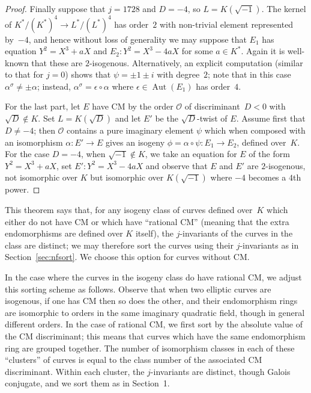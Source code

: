 \documentclass{article}
\theoremstyle{remark}
\def\OO{{\mathcal O}}
\DeclareMathOperator{\Aut}{Aut}
\begin{document}
\begin{proof}
Finally suppose that $j=1728$ and $D=-4$, so $L=K(\sqrt{-1})$.  The
kernel of $K^*/(K^*)^4 \to L^*/(L^*)^4$ has order~$2$ with non-trivial
element represented by~$-4$, and hence without loss of generality we
may suppose that $E_1$ has equation $Y^2=X^3+aX$ and $E_2:
Y^2=X^3-4aX$ for some $a\in K^*$.  Again it is well-known that these
are $2$-isogenous.  Alternatively, an explicit computation (similar to
that for $j=0$) shows that $\psi=\pm1\pm i$ with degree~$2$; note that
in this case $\alpha^{\sigma}\not=\pm\alpha$; instead,
$\alpha^{\sigma}=\epsilon\circ\alpha$ where $\epsilon\in\Aut(E_1)$ has
order~$4$.

For the last part, let $E$ have CM by the order $\OO$ of
discriminant~$D<0$ with $\sqrt{D}\notin K$.  Set $L=K(\sqrt{D})$ and
let $E'$ be the $\sqrt{D}$-twist of $E$.  Assume first that
$D\not=-4$; then $\OO$ contains a pure imaginary element $\psi$ which
when composed with an isomorphism $\alpha:E'\to E$ gives an isogeny
$\phi=\alpha\circ\psi:E_1\to E_2$, defined over~$K$.  For the case
$D=-4$, when $\sqrt{-1}\notin K$, we take an equation for $E$ of the
form $Y^2=X^3+aX$, set $E': Y^2=X^3-4aX$ and observe that $E$ and $E'$
are $2$-isogenous, not isomorphic over $K$ but isomorphic over
$K(\sqrt{-1})$ where $-4$ becomes a $4$th power.

\end{proof}

This theorem says that, for any isogeny class of curves defined
over~$K$ which either do not have CM or which have ``rational CM''
(meaning that the extra endomorphisms are defined over $K$ itself),
the $j$-invariants of the curves in the class are distinct; we may
therefore sort the curves using their $j$-invariants as in
Section~\ref{sec:nfsort}.  We choose this option for curves without
CM.

In the case where the curves in the isogeny class do have rational CM,
we adjust this sorting scheme as follows.  Observe that when two
elliptic curves are isogenous, if one has CM then so does the other,
and their endomorphism rings are isomorphic to orders in the same
imaginary quadratic field, though in general different orders.  In the
case of rational CM, we first sort by the absolute value of the CM
discriminant; this means that curves which have the same endomorphism
ring are grouped together.  The number of isomorphism classes in each
of these ``clusters'' of curves is equal to the class number of the
associated CM discriminant.  Within each cluster, the $j$-invariants
are distinct, though Galois conjugate, and we sort them as in
Section~1.
\end{document}
